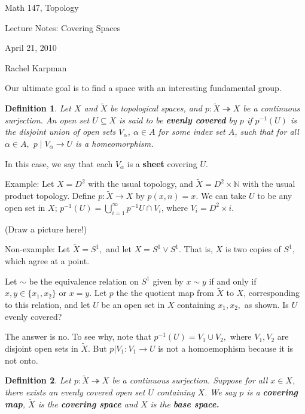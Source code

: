 \documentclass{amsart}
\newcommand{\N}{\mathbb N}
\newtheorem{defn}{Definition}
\begin{document}
Math 147, Topology

Lecture Notes: Covering Spaces

April 21, 2010

Rachel Karpman

\setlength{\parskip}{0.1 in}

Our ultimate goal is to find a space with an interesting fundamental group.  

\begin{defn}  Let $X$ and $\tilde{X}$ be topological spaces, and $p:\tilde{X}\twoheadrightarrow X$ be a continuous surjection.  An open set $U \subseteq X$ is said to be \textbf{evenly covered} by $p$ if $p^{-1}(U)$ is the disjoint union of open sets $V_{\alpha}$, $\alpha \in A$ for some index set $A$, such that for all $\alpha \in A,$ $p \mid V_{\alpha} \rightarrow U$ is a homeomorphism.  
\end{defn}

In this case, we say that each $V_{\alpha}$ is a \textbf{sheet} covering $U$.

Example: Let $X=D^2$ with the usual topology, and $\tilde{X}=D^2 \times \N$ with the usual product topology.  Define $p:\tilde{X} \rightarrow X$ by $p(x,n)=x.$  We can take $U$ to be any open set in $X$; $\displaystyle p^{-1}(U)=\bigcup_{i=1}^{\infty}p^{-1}{U}\cap V_i$, where $V_i=D^2 \times i$.  

(Draw a picture here!)\vspace{2 in}

Non-example:  Let $\tilde{X}=S^1,$ and let $X=S^1 \lor S^1.$  That is, $X$ is two copies of $S^1,$ which agree at a point.  

Let $\sim$ be the equivalence relation on $S^1$ given by $x \sim y$ if and only if $x,y \in \{x_1,x_2\}$ or $x=y$.  Let $p$ the the quotient map from $\tilde{X}$ to $X$, corresponding to this relation, and let $U$ be an open set in $X$ containing $x_1,x_2,$ as shown.  Is $U$ evenly covered?

The answer is no.  To see why, note that $p^{-1}(U)=V_1 \cup V_2,$ where $V_1,V_2$ are disjoint open sets in $\tilde{X}$.  But $p \vert V_1: V_1 \rightarrow U$ is not a homoemophism because it is not onto.  

\begin{defn}  Let $p: \tilde{X} \twoheadrightarrow X$ be a continuous surjection.  Suppose for all $x \in X$, there exists an evenly covered open set $U$ containing $X$.   We say $p$ is a \textbf{covering map}, $\tilde{X}$ is the \textbf{covering space} and $X$ is the \textbf{base space.}
\end{defn}
\end{document}
